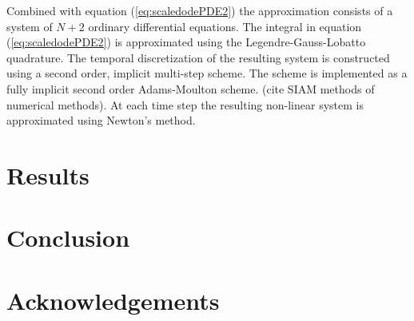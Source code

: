\documentclass[12pt]{article}
\begin{document}
Combined with equation (\ref{eq:scaledodePDE2}) the approximation
consists of a system of $N+2$ ordinary differential equations. The
integral in equation (\ref{eq:scaledodePDE2}) is approximated using
the Legendre-Gauss-Lobatto quadrature. The temporal discretization of
the resulting system is constructed using a second order, implicit
multi-step scheme. The scheme is implemented as a fully implicit
second order Adams-Moulton scheme.  (cite SIAM methods of numerical
methods). At each time step the resulting non-linear system is
approximated using Newton's method.

\section{Results}
\label{section:results}

\section{Conclusion}

\section{Acknowledgements}
\end{document}
